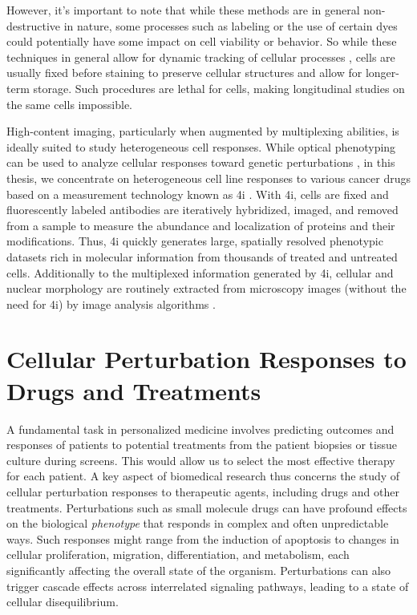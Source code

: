 However, it's important to note that while these methods are in general non-destructive in nature, some processes such as labeling or the use of certain dyes could potentially have some impact on cell viability or behavior. So while these techniques in general allow for dynamic tracking of cellular processes \citep{fischer2019inferring, hashimoto2016learning, tvarusko1999time, busch2015fundamental}, cells are usually fixed before staining to preserve cellular structures and allow for longer-term storage. Such procedures are lethal for cells, making longitudinal studies on the same cells impossible.

High-content imaging, particularly when augmented by multiplexing abilities, is ideally suited to study heterogeneous cell responses.
While optical phenotyping can be used to analyze cellular responses toward genetic perturbations \citep{feldman2022pooled}, in this thesis, we concentrate on heterogeneous cell line responses to various cancer drugs based on a measurement technology known as \acrfull{4i} \citep{gut2018multiplexed}.
With \acrshort{4i}, cells are fixed and fluorescently labeled antibodies are iteratively hybridized, imaged, and removed from a sample to measure the abundance and localization of proteins and their modifications. 
Thus, \acrshort{4i} quickly generates large, spatially resolved phenotypic datasets rich in molecular information from thousands of treated and untreated cells. Additionally to the multiplexed information generated by \acrshort{4i}, cellular and nuclear morphology are routinely extracted from microscopy images (without the need for \acrshort{4i}) by image analysis algorithms \citep{carpenter2006cellprofiler}.

\section{Cellular Perturbation Responses to Drugs and Treatments}
\label{sec:cell_perturbation_responses}

A fundamental task in personalized medicine involves predicting outcomes and responses of patients to potential treatments from the patient biopsies or tissue culture during screens. This would allow us to select the most effective therapy for each patient.
A key aspect of biomedical research thus concerns the study of cellular perturbation responses to therapeutic agents, including drugs and other treatments.
Perturbations such as small molecule drugs can have profound effects on the biological \emph{phenotype} that responds in complex and often unpredictable ways.
Such responses might range from the induction of apoptosis to changes in cellular proliferation, migration, differentiation, and metabolism, each significantly affecting the overall state of the organism. 
Perturbations can also trigger cascade effects across interrelated signaling pathways, leading to a state of cellular disequilibrium.

